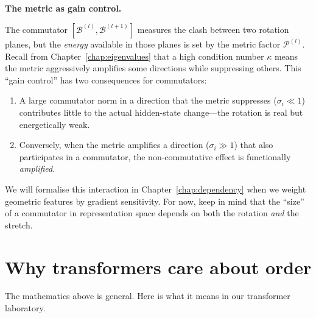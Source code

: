 \documentclass[11pt, twoside, openright]{memoir}
\newcommand{\bivec}[1]{\mathcal{B}^{(#1)}}  %
\newcommand{\metric}[1]{\mathcal{P}^{(#1)}} %
\numberwithin{equation}{chapter}
\begin{document}
\begin{keyidea}
\textbf{The metric as gain control.}

The commutator $[\bivec{l}, \bivec{l+1}]$ measures the clash between
two rotation planes, but the \emph{energy} available in those planes
is set by the metric factor $\metric{l}$.  Recall from
Chapter~\ref{chap:eigenvalues} that a high condition number $\kappa$
means the metric aggressively amplifies some directions while
suppressing others.  This ``gain control'' has two consequences for
commutators:

\begin{enumerate}[nosep]
\item A large commutator norm in a direction that the metric
  suppresses ($\sigma_i \ll 1$) contributes little to the actual
  hidden-state change---the rotation is real but energetically weak.
\item Conversely, when the metric amplifies a direction
  ($\sigma_i \gg 1$) that also participates in a commutator, the
  non-commutative effect is functionally \emph{amplified}.
\end{enumerate}

We will formalise this interaction in Chapter~\ref{chap:dependency}
when we weight geometric features by gradient sensitivity.  For now,
keep in mind that the ``size'' of a commutator in representation space
depends on both the rotation \emph{and} the stretch.
\end{keyidea}

\section{Why transformers care about order}

The mathematics above is general.  Here is what it means in our
transformer laboratory.
\end{document}
